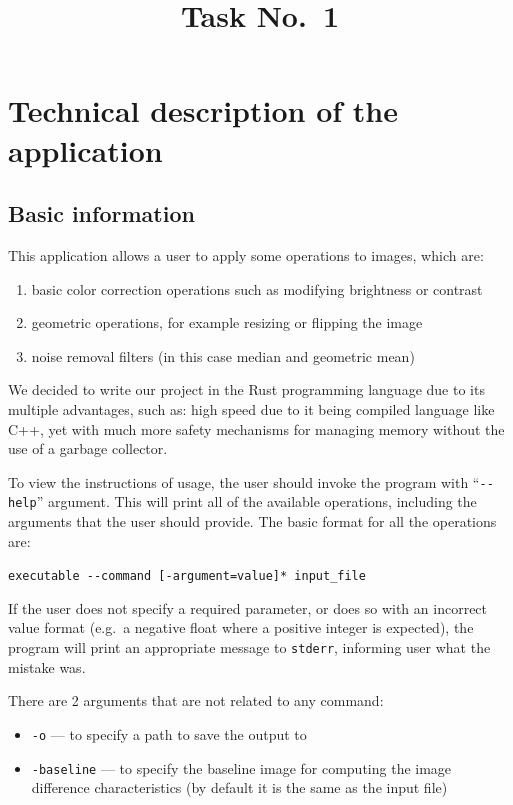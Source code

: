 \documentclass[12pt]{article}
\title{Task No.~1}
\begin{document}
\maketitle

\section{Technical description of the application}
\subsection{Basic information}

This application allows a user to apply some operations to images, which are:
\begin{enumerate}
    \item basic color correction operations such as modifying brightness or contrast
    \item geometric operations, for example resizing or flipping the image
    \item noise removal filters (in this case median and geometric mean)
\end{enumerate}
We decided to write our project in the Rust programming language due to its multiple advantages, such as:
high speed due to it being compiled language like C++, yet with much more safety mechanisms for managing memory without the use of a garbage collector.

To view the instructions of usage, the user should invoke the program with ``\lstinline{--help}'' argument.
This will print all of the available operations, including the arguments that the user should provide.
The basic format for all the operations are:
\begin{center}
    \lstinline{executable --command [-argument=value]* input_file}
\end{center}

If the user does not specify a required parameter, or does so with an incorrect value format (e.g.\ a negative float where a positive integer is expected), 
the program will print an appropriate message to \texttt{stderr}, informing user what the mistake was.

There are 2 arguments that are not related to any command:
\begin{itemize}
    \item[] \texttt{-o} --- to specify a path to save the output to
    \item[] \texttt{-baseline} --- to specify the baseline image for computing the image difference characteristics (by default it is the same as the input file)
\end{itemize}
\end{document}
